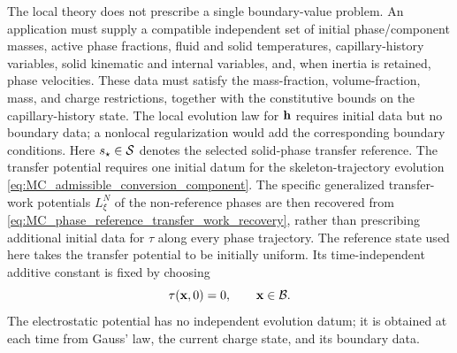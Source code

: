 The local theory does not prescribe a single boundary-value problem.  An
application must supply a compatible independent set of initial
phase/component masses, active phase fractions, fluid and solid temperatures,
capillary-history variables, solid kinematic and internal variables, and, when
inertia is retained, phase velocities.  These data must satisfy the
mass-fraction, volume-fraction, mass, and charge restrictions, together with the
constitutive bounds on the capillary-history state.
The local evolution law for \(\mathbf{h}\) requires initial data but no boundary
data; a nonlocal regularization would add the corresponding boundary
conditions.  Here \(s_\star\in\mathcal{S}\) denotes the selected solid-phase
transfer reference.  The transfer potential requires one
initial datum
for the skeleton-trajectory evolution
\eqref{eq:MC_admissible_conversion_component}.  The specific generalized transfer-work
potentials \(L_\xi^N\) of the non-reference phases are then recovered from
\eqref{eq:MC_phase_reference_transfer_work_recovery}, rather than prescribing
additional initial data for \(\tau\) along every phase trajectory.  The
reference state used here takes the transfer potential to be initially
uniform.  Its time-independent additive constant is fixed by choosing
%
\begin{equation}
	\tau(\mathbf{x},0)=0,
	\qquad
	\mathbf{x}\in\mathcal{B} .
	\label{eq:transfer_potential_initial_gauge}
\end{equation}
%
The electrostatic potential has no independent evolution datum; it is obtained
at each time from Gauss' law, the current charge state, and its boundary data.


